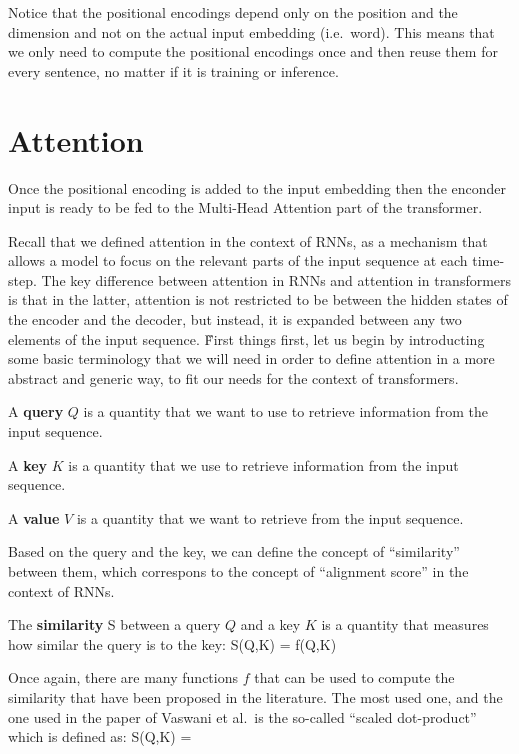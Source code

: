 \be
{}
\ee

Notice that the positional encodings depend only on the position and the dimension and not on the actual input
embedding (i.e.\ word). This means that we only need to compute the positional encodings once and then reuse them for
every sentence, no matter if it is training or inference.

\be
{}
\ee

\section{Attention}

Once the positional encoding is added to the input embedding then the enconder input is ready to be fed to the
Multi-Head Attention part of the transformer.


Recall that we defined attention in the context of RNNs, as a mechanism that allows a model to focus on the relevant
parts of the input sequence at each time-step. The key difference between attention in RNNs and attention in
transformers is that in the latter, attention is not restricted to be between the hidden states of the encoder and
the decoder, but instead, it is expanded between any two elements of the input sequence. \v

First things first, let us begin by introducting some basic terminology that we will need in order to define attention
in a more abstract and generic way, to fit our needs for the context of transformers.

\bd[Query]
A \textbf{query} $Q$ is a quantity that we want to use to retrieve information from the input sequence.
\ed

\bd[Key]
A \textbf{key} $K$ is a quantity that we use to retrieve information from the input sequence.
\ed

\bd[Value]
A \textbf{value} $V$ is a quantity that we want to retrieve from the input sequence.
\ed

Based on the query and the key, we can define the concept of ``similarity'' between them, which correspons to the
concept of ``alignment score'' in the context of RNNs.

\bd[Similarity]
The \textbf{similarity} S between a query $Q$ and a key $K$ is a quantity that measures how similar the query is to
the key:
\bse
S(Q,K) = f(Q,K)
\ese
\ed

Once again, there are many functions $f$ that can be used to compute the similarity that have been proposed in the
literature. The most used one, and the one used in the paper of Vaswani et al.\ is the so-called ``scaled dot-product''
which is defined as:
\bse
S(Q,K) = 
\ese

